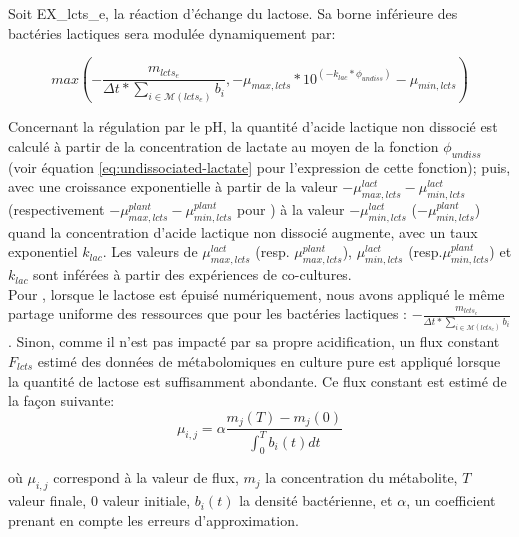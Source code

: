 Soit EX\_lcts\_e, la réaction d'échange du lactose. Sa borne inférieure des bactéries lactiques sera modulée dynamiquement par:

\begin{equation}
max(-\frac{m_{lcts_e}}{\Delta t*\sum_{i \in \mathcal{M}(lcts_e)} b_i},-\mu_{max,lcts}*10^{(-k_{lac}*\phi_{undiss})}-\mu_{min,lcts})
\label{eq:lactose_lab}
\end{equation}

Concernant la régulation par le pH, la quantité d'acide lactique non dissocié est calculé à partir de la concentration de lactate au moyen de la fonction $\phi_{undiss}$ (voir équation \ref{eq:undissociated-lactate} pour l'expression de cette fonction); puis, avec une croissance exponentielle à partir de la valeur $-\mu^{lact}_{max,lcts}-\mu^{lact}_{min,lcts}$ (respectivement $-\mu^{plant}_{max,lcts}-\mu^{plant}_{min,lcts}$ pour \plantarum) à la valeur $-\mu^{lact}_{min,lcts}$ ($-\mu^{plant}_{min,lcts}$) quand la concentration d'acide lactique non dissocié augmente, avec un taux exponentiel $k_{lac}$. Les valeurs de $\mu^{lact}_{max,lcts}$ (resp. $\mu^{plant}_{max,lcts}$), $\mu^{lact}_{min,lcts}$ (resp.$\mu^{plant}_{min,lcts}$) et $k_{lac}$ sont inférées à partir des expériences de co-cultures. \\


Pour \freud, lorsque le lactose est épuisé numériquement, nous avons appliqué le même partage uniforme des ressources que pour les bactéries lactiques : $-\frac{m_{lcts_e}}{\Delta t*\sum_{i \in \mathcal{M}(lcts_e)} b_i}$. Sinon, comme il n'est pas impacté par sa propre acidification, un flux constant $F_{lcts}$ estimé des données de métabolomiques en culture pure est appliqué lorsque la quantité de lactose est suffisamment abondante. Ce flux constant est estimé de la façon suivante:
\begin{equation}
\label{sec:estimate-bounds-freud}
 {\mu}_{i,j} = \alpha \frac{ m_j(T)-m_j(0)}{\int_0^T b_i(t) dt}
\end{equation}
 
où ${\mu}_{i,j}$ correspond à la valeur de flux,  $m_j$ la concentration du métabolite, $T$ valeur finale, $0$ valeur initiale, $b_i(t)$ la densité bactérienne, et $\alpha$, un coefficient prenant en compte les erreurs d'approximation.




